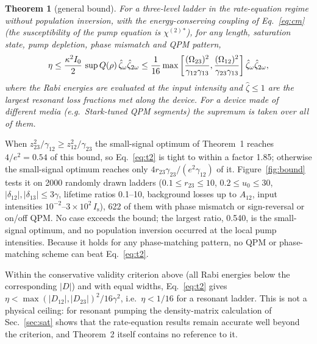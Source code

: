 \documentclass[11pt]{article}
\newcommand{\chitwo}{\chi^{(2)}}
\newcommand{\Is}{I_\mathrm{s}}
\let\hbar\relax\DeclareRobustCommand{\hbar}{{\mathchar'26\mkern-9mu h}}
\newtheorem{theorem}{Theorem}
\begin{document}
\begin{theorem}[general bound]
For a three-level ladder in the rate-equation regime without population inversion, with the energy-conserving coupling of Eq.~\eqref{eq:cm} (the susceptibility of the pump equation is $\chitwo{}^*$), for any length, saturation state, pump depletion, phase mismatch and QPM pattern,
\begin{equation}
\eta\le\frac{\kappa^2I_0}{2}\,\sup Q(\rho)\,\hat\zeta_\omega\hat\zeta_{2\omega}\le\frac{1}{16}\max\left[\frac{(\hbar\Omega_{23})^2}{\gamma_{12}\gamma_{13}},\frac{(\hbar\Omega_{12})^2}{\gamma_{23}\gamma_{13}}\right]\hat\zeta_\omega\hat\zeta_{2\omega},\label{eq:t2}
\end{equation}
where the Rabi energies are evaluated at the input intensity and $\hat\zeta\le1$ are the largest resonant loss fractions met along the device. For a device made of different media (e.g.\ Stark-tuned QPM segments) the supremum is taken over all of them.
\end{theorem}

When $z_{23}^2/\gamma_{12}\ge z_{12}^2/\gamma_{23}$ the small-signal optimum of Theorem~1 reaches $4/e^2=0.54$ of this bound, so Eq.~\eqref{eq:t2} is tight to within a factor 1.85; otherwise the small-signal optimum reaches only $4r_{23}\gamma_{23}/(e^2\gamma_{12})$ of it. Figure~\ref{fig:bound} tests it on 2000 randomly drawn ladders ($0.1\le r_{23}\le10$, $0.2\le u_0\le30$, $|\delta_{12}|,|\delta_{13}|\le3\gamma$, lifetime ratios 0.1--10, background losses up to $A_{12}$, input intensities $10^{-2}$--$3\times10^2\,\Is$), 622 of them with phase mismatch or sign-reversal or on/off QPM. No case exceeds the bound; the largest ratio, 0.540, is the small-signal optimum, and no population inversion occurred at the local pump intensities. Because it holds for any phase-matching pattern, no QPM or phase-matching scheme can beat Eq.~\eqref{eq:t2}.

Within the conservative validity criterion above (all Rabi energies below the corresponding $|D|$) and with equal widths, Eq.~\eqref{eq:t2} gives $\eta<\max(|D_{12}|,|D_{23}|)^2/16\gamma^2$, i.e.\ $\eta<1/16$ for a resonant ladder. This is not a physical ceiling: for resonant pumping the density-matrix calculation of Sec.~\ref{sec:sat} shows that the rate-equation results remain accurate well beyond the criterion, and Theorem~2 itself contains no reference to it.
\end{document}
